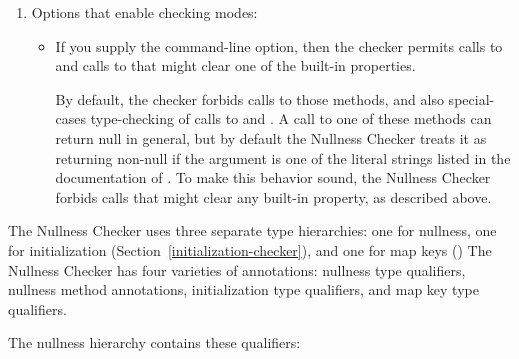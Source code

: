\begin{enumerate}
\item
  Options that enable checking modes:

\begin{itemize}
\item
  If you supply the  command-line option,
  then the checker permits calls to
  and calls to
  that might clear one of the built-in properties.

  By default, the checker forbids calls to those methods, and also
  special-cases type-checking of calls to
  and
  .
  A call to one of these methods
  can return null in general, but by default the Nullness Checker treats it
  as returning non-null if the argument is one of the literal strings
  listed in the documentation of
  .
  To make this behavior sound, the Nullness Checker forbids calls that
  might clear any built-in property, as described above.
\end{itemize}

\end{enumerate}



The Nullness Checker uses three separate type hierarchies:  one for nullness,
one for initialization (Section~\ref{initialization-checker}),
and one for map keys ()
The Nullness Checker has four varieties of annotations:  nullness
type qualifiers, nullness method annotations, initialization type qualifiers, and
map key type
qualifiers.


The nullness hierarchy contains these qualifiers:


